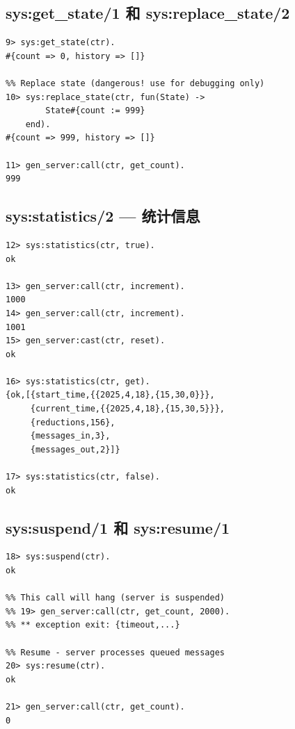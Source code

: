 \documentclass[a4paper,11pt]{article}
\begin{document}
\subsection{sys:get\_state/1 和 sys:replace\_state/2}

\begin{lstlisting}[style=shellstyle, caption={直接读取和修改服务器状态}]
%% Get raw state (bypasses format_status)
9> sys:get_state(ctr).
#{count => 0, history => []}

%% Replace state (dangerous! use for debugging only)
10> sys:replace_state(ctr, fun(State) ->
        State#{count := 999}
    end).
#{count => 999, history => []}

11> gen_server:call(ctr, get_count).
999
\end{lstlisting}

\subsection{sys:statistics/2 --- 统计信息}

\begin{lstlisting}[style=shellstyle, caption={收集统计信息}]
12> sys:statistics(ctr, true).
ok

13> gen_server:call(ctr, increment).
1000
14> gen_server:call(ctr, increment).
1001
15> gen_server:cast(ctr, reset).
ok

16> sys:statistics(ctr, get).
{ok,[{start_time,{{2025,4,18},{15,30,0}}},
     {current_time,{{2025,4,18},{15,30,5}}},
     {reductions,156},
     {messages_in,3},
     {messages_out,2}]}

17> sys:statistics(ctr, false).
ok
\end{lstlisting}

\subsection{sys:suspend/1 和 sys:resume/1}

\begin{lstlisting}[style=shellstyle, caption={挂起和恢复服务器}]
%% Suspend - server stops processing messages
18> sys:suspend(ctr).
ok

%% This call will hang (server is suspended)
%% 19> gen_server:call(ctr, get_count, 2000).
%% ** exception exit: {timeout,...}

%% Resume - server processes queued messages
20> sys:resume(ctr).
ok

21> gen_server:call(ctr, get_count).
0
\end{lstlisting}
\end{document}
